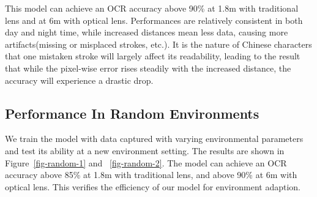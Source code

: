 This model can achieve an OCR accuracy above 90\% at 1.8m with traditional lens and at 6m with optical lens. Performances are relatively consistent in both day and night time, while increased distances mean less data, causing more artifacts(missing or misplaced strokes, etc.). It is the nature of Chinese characters that one mistaken stroke will largely affect its readability, leading to the result that while the pixel-wise error rises steadily with the increased distance, the accuracy will experience a drastic drop.

\subsection{Performance In Random Environments}
We train the model with data captured with varying environmental parameters and test its ability at a new environment setting. The results are shown in Figure~\ref{fig-random-1} and ~\ref{fig-random-2}. The model can achieve an OCR accuracy above 85\% at 1.8m with traditional lens, and above 90\% at 6m with optical lens. This verifies the efficiency of our model for environment adaption.



